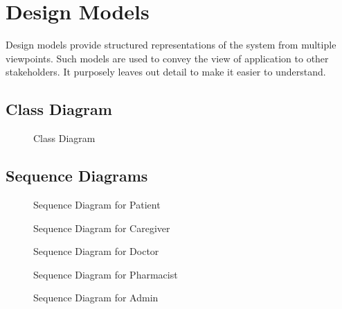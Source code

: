 \section{Design Models}

Design models provide structured representations of the system from multiple viewpoints. Such models are used to convey the view of application to other stakeholders. It purposely leaves out detail to make it easier to understand.

\subsection{Class Diagram}

\begin{figure}[H]
\centering
\caption{Class Diagram}
\label{fig:class-diagram}
\end{figure}

\subsection{Sequence Diagrams}

\begin{figure}[H]
\centering
\caption{Sequence Diagram for Patient}
\label{fig:seq-patient}
\end{figure}

\begin{figure}[H]
\centering
\caption{Sequence Diagram for Caregiver}
\label{fig:seq-caregiver}
\end{figure}

\begin{figure}[H]
\centering
\caption{Sequence Diagram for Doctor}
\label{fig:seq-doctor}
\end{figure}

\begin{figure}[H]
\centering
\caption{Sequence Diagram for Pharmacist}
\label{fig:seq-pharmacist}
\end{figure}

\begin{figure}[H]
\centering
\caption{Sequence Diagram for Admin}
\label{fig:seq-admin}
\end{figure}

